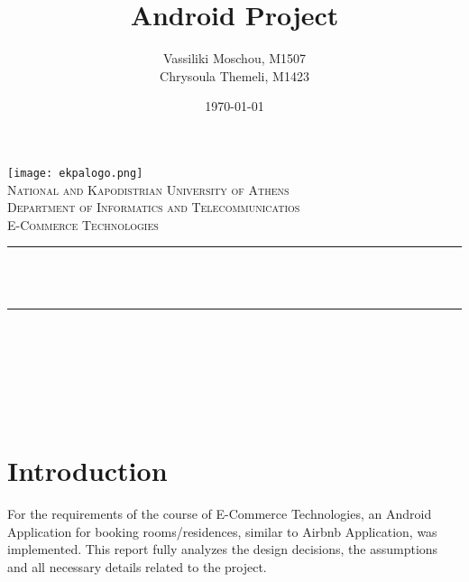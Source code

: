 \documentclass[12pt]{article}
\title{Android Project}
\author{Vassiliki Moschou, M1507 \\
	Chrysoula Themeli, M1423}                               %
\date{\today}                                           %
\makeatletter
\let\thetitle\@title
\let\theauthor\@author
\let\thedate\@date
\makeatother
\begin{document}

\begin{titlepage}
    \centering
    \vspace*{0.5 cm}
    \texttt{[image: ekpalogo.png]}\\[1.0 cm]   %
    \textsc{\LARGE National and Kapodistrian University of Athens}\\[2.0 cm]   %
    \textsc{\Large Department of Informatics and Telecommunicatios}\\[0.5 cm]               %
    \textsc{\large E-Commerce Technologies}\\[0.5 cm]               %
    \rule{\linewidth}{0.2 mm} \\[0.4 cm]
    { \huge \bfseries \thetitle}\\
    \rule{\linewidth}{0.2 mm} \\[1.5 cm]
    
    \begin{minipage}{0.4\textwidth}
        \begin{center} \large
            \theauthor
            \end{center}
            \end{minipage}~
            \begin{minipage}{0.4\textwidth}
    \end{minipage}\\[2 cm]
    
    {\large \thedate}\\[2 cm]
 
    \vfill
    
\end{titlepage}


\tableofcontents
\pagebreak


\section{Introduction}
For the requirements of the course of E-Commerce Technologies, an Android Application for booking rooms/residences, similar to Airbnb Application, was implemented. This report fully analyzes the design decisions, the assumptions and all necessary details related to the project. 
\end{document}
